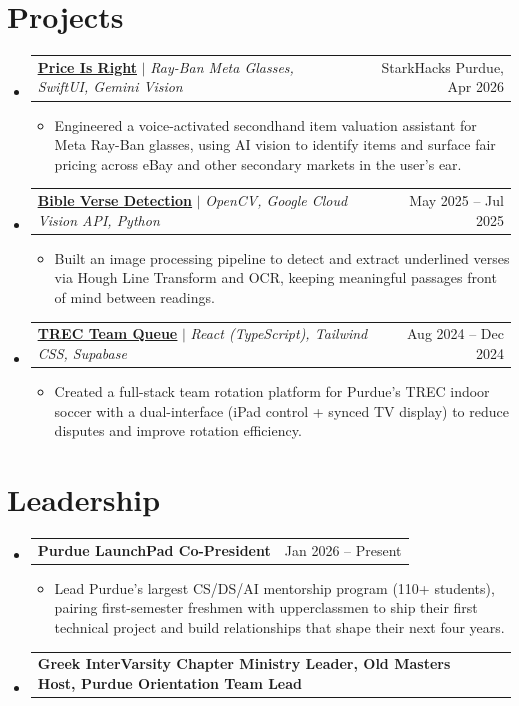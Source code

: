 \documentclass[letterpaper,11pt]{article}
\makeatletter
\newcommand{\resumeItem}[1]{
  \item\small{
    {#1 \vspace{-2pt}}
  }
}
\newcommand{\resumeProjectHeading}[2]{
    \item
    \begin{tabular*}{0.97\textwidth}{l@{\extracolsep{\fill}}r}
      \small#1 & #2 \\
    \end{tabular*}\vspace{-7pt}
}
\newcommand{\resumeSubHeadingListStart}{\begin{itemize}[leftmargin=0.15in, label={}]}
\newcommand{\resumeSubHeadingListEnd}{\end{itemize}}
\newcommand{\resumeItemListStart}{\begin{itemize}}
\newcommand{\resumeItemListEnd}{\end{itemize}\vspace{-5pt}}
\makeatother
\begin{document}
\section{Projects}
    \resumeSubHeadingListStart
      \resumeProjectHeading
          {\underline{\href{https://github.com/Zekepeke/Price-is-right}{\textbf{Price Is Right}}} $|$ \emph{Ray-Ban Meta Glasses, SwiftUI, Gemini Vision}}{StarkHacks Purdue, Apr 2026}
          \resumeItemListStart
            \resumeItem{Engineered a voice-activated secondhand item valuation assistant for Meta Ray-Ban glasses, using AI vision to identify items and surface fair pricing across eBay and other secondary markets in the user's ear.}
          \resumeItemListEnd
      \resumeProjectHeading
          {\underline{\href{https://github.com/Nick-Wu5/VerseDetection}{\textbf{Bible Verse Detection\vphantom{p}}}} $|$ \emph{OpenCV, Google Cloud Vision API, Python}}{May 2025 -- Jul 2025}
          \resumeItemListStart
            \resumeItem{Built an image processing pipeline to detect and extract underlined verses via Hough Line Transform and OCR, keeping meaningful passages front of mind between readings.}
          \resumeItemListEnd
      \resumeProjectHeading
          {\underline{\href{https://github.com/Nick-Wu5/TREC_Team_Queue}{\textbf{TREC Team Queue}}} $|$ \emph{React (TypeScript), Tailwind CSS, Supabase}}{Aug 2024 -- Dec 2024}
          \resumeItemListStart
            \resumeItem{Created a full-stack team rotation platform for Purdue's TREC indoor soccer with a dual-interface (iPad control + synced TV display) to reduce disputes and improve rotation efficiency.}
          \resumeItemListEnd
    \resumeSubHeadingListEnd

%
\section{Leadership}
  \resumeSubHeadingListStart
    \resumeProjectHeading
      {\textbf{Purdue LaunchPad Co-President}{}}{Jan 2026 -- Present}
      \resumeItemListStart
        \resumeItem{Lead Purdue's largest CS/DS/AI mentorship program (110+ students), pairing first-semester freshmen with upperclassmen to ship their first technical project and build relationships that shape their next four years.}
      \resumeItemListEnd
\resumeProjectHeading
  {\textbf{Greek InterVarsity Chapter Ministry Leader, Old Masters Host, Purdue Orientation Team Lead}{}}{}  \resumeSubHeadingListEnd

\end{document}
